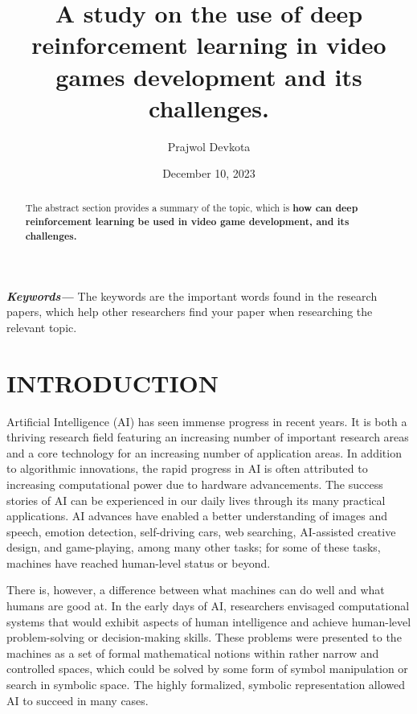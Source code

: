 \documentclass{article}
\title{A study on the use of deep reinforcement learning in video games development and its challenges.}
\author{Prajwol Devkota }
\date{December 10, 2023}
\providecommand{\keywords}[1] {
\small \textbf{\textit{Keywords---}} #1
}
\begin{document}
\maketitle
\begin{abstract}
The abstract section provides a summary of the topic, which is \textbf{how can deep reinforcement learning be used in video game development, and its challenges.} 
\end{abstract}

\keywords {The keywords are the important words found in the research papers, which help other researchers find your paper when researching the relevant topic.}

\newpage

\tableofcontents

\newpage

\section{INTRODUCTION}

Artificial Intelligence (AI) has seen immense progress in recent years. It is both a thriving research field featuring an increasing number of important research areas and a core technology for an increasing number of application areas. In addition to algorithmic innovations, the rapid progress in AI is often attributed to increasing computational power due to hardware advancements. The success stories of AI can be experienced in our daily lives through its many practical applications. AI advances have enabled a better understanding of images and speech, emotion detection, self-driving cars, web searching, AI-assisted creative design, and game-playing,
among many other tasks; for some of these tasks, machines have reached human-level status or beyond.

There is, however, a difference between what machines can do well and what humans are good at. In the early days of AI, researchers envisaged computational systems that would exhibit aspects of human intelligence and achieve human-level problem-solving or decision-making skills. These problems were presented to the machines as a set of formal mathematical notions within rather narrow and controlled spaces, which could be solved by some form of symbol manipulation or search in symbolic space. The highly formalized, symbolic representation allowed AI to succeed in many cases.
\end{document}
